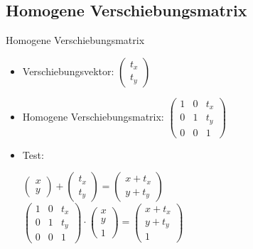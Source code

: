 \documentclass[10pt,aspectratio=169]{beamer}
\begin{document}
  \subsection{Homogene Verschiebungsmatrix}
  \begin{frame}{Homogene Verschiebungsmatrix}
    \begin{itemize}
      \item Verschiebungsvektor: $\begin{pmatrix}
        t_x\\t_y
      \end{pmatrix}$
      \item Homogene Verschiebungsmatrix: $\begin{pmatrix}
        1 & 0 & t_x\\
        0 & 1 & t_y\\
        0 & 0 & 1
      \end{pmatrix}$
      \item Test:\\\vspace{0.2cm}
      \begin{center}
        $
        \begin{pmatrix}
          x\\y
        \end{pmatrix} + 
        \begin{pmatrix}
          t_x\\t_y
        \end{pmatrix}
        =
        \begin{pmatrix}
          x + t_x\\
          y + t_y
        \end{pmatrix}
        $\\\vspace{0.2cm}$
        \begin{pmatrix}
          1 & 0 & t_x\\
          0 & 1 & t_y\\
          0 & 0 & 1
        \end{pmatrix}
        \cdot \begin{pmatrix}
          x\\y\\1
        \end{pmatrix}
        = \begin{pmatrix}
          x + t_x\\
          y + t_y\\
          1
        \end{pmatrix}
        $
      \end{center}
    \end{itemize}
  \end{frame}
\end{document}
